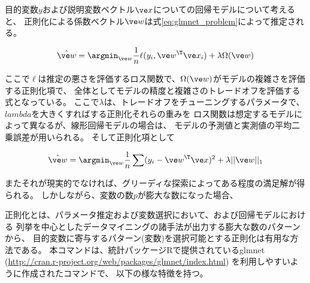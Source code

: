 
目的変数$y$および説明変数ベクトル$\ve x$についての回帰モデルについて考えると、
正則化による係数ベクトル$\ve w$は式\ref{eq:glmnet_problem}によって推定される。

\begin{equation}
\hat {\ve w}=\argmin_{\ve w} \frac{1}{n}\ell(y_i,{\ve w}^{\T}{\ve x}_i)+\lambda \Omega({\ve w})
\label{eq:glmnet_problem}
\end{equation}

ここで$\ell$は推定の悪さを評価するロス関数で、$\Omega({\ve w})$がモデルの複雑さを評価する正則化項で、
全体としてモデルの精度と複雑さのトレードオフを評価する式となっている。
ここで$\lambda$は、トレードオフをチューニングするパラメータで、
$lambda$を大きくすればする正則化それらの重みを
ロス関数は想定するモデルによって異なるが、線形回帰モデルの場合は、
モデルの予測値と実測値の平均二乗誤差が用いられる。
そして正則化項として

\begin{equation}
\hat {\ve w}=\argmin_{\ve w} \frac{1}{n} \sum (y_i-{\ve w}^{\T}{\ve x})^2 + \lambda ||{\ve w}||_1
\label{eq:glmnet_problem}
\end{equation}

またそれが現実的でなければ、グリーディな探索によってある程度の満足解が得られる。
しかしながら、変数の数$p$が膨大な数になった場合、

正則化とは、パラメータ推定および変数選択において、および回帰モデルにおける
列挙を中心としたデータマイニングの諸手法が出力する膨大な数のパターンから、
目的変数に寄与するパターン(変数)を選択可能とする正則化は有用な方法である。
本コマンドは、統計パッケージRで提供されているglmnet
(\url{http://cran.r-project.org/web/packages/glmnet/index.html})
を利用しやすいように作成されたコマンドで、
以下の様な特徴を持つ。

